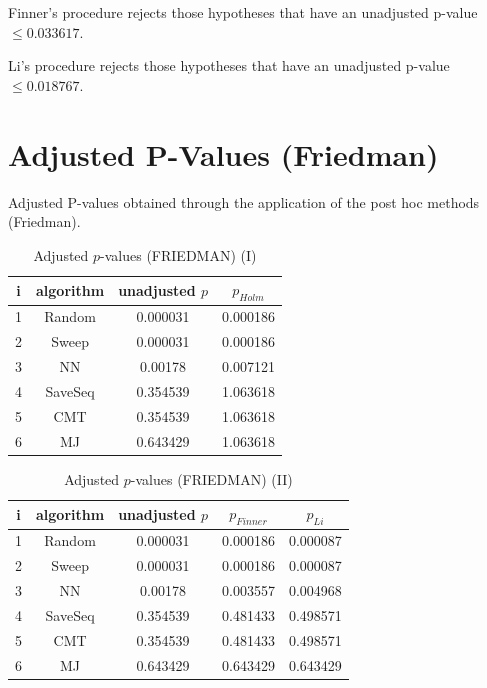 \documentclass[a4paper,10pt]{article}
\begin{document}
\begin{landscape}
Finner's procedure rejects those hypotheses that have an unadjusted p-value $\le0.033617$.

Li's procedure rejects those hypotheses that have an unadjusted p-value $\le0.018767$.


\newpage

\section{Adjusted P-Values (Friedman)}


Adjusted P-values obtained through the application of the post hoc methods (Friedman).

\begin{table}[!htp]
\centering\small
\begin{tabular}{cccc}
i&algorithm&unadjusted $p$&$p_{Holm}$\\
\hline1&Random&0.000031&0.000186\\2&Sweep&0.000031&0.000186\\3&NN&0.00178&0.007121\\4&SaveSeq&0.354539&1.063618\\5&CMT&0.354539&1.063618\\6&MJ&0.643429&1.063618\\\hline
\end{tabular}
\caption{Adjusted $p$-values (FRIEDMAN) (I)}
\end{table}
\begin{table}[!htp]
\centering\small
\begin{tabular}{ccccc}
i&algorithm&unadjusted $p$&$p_{Finner}$&$p_{Li}$\\
\hline1&Random&0.000031&0.000186&0.000087\\2&Sweep&0.000031&0.000186&0.000087\\3&NN&0.00178&0.003557&0.004968\\4&SaveSeq&0.354539&0.481433&0.498571\\5&CMT&0.354539&0.481433&0.498571\\6&MJ&0.643429&0.643429&0.643429\\\hline
\end{tabular}
\caption{Adjusted $p$-values (FRIEDMAN) (II)}
\end{table}

\newpage
\end{landscape}
\end{document}
